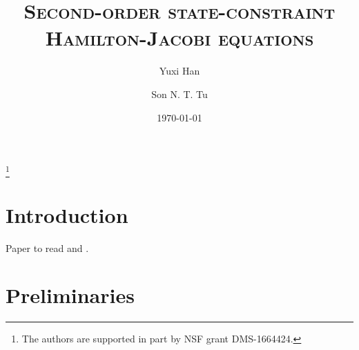 \documentclass[11pt,reqno]{amsart}
\numberwithin{figure}{section}
\theoremstyle{plain}
\theoremstyle{remark}
\numberwithin{equation}{section}
\begin{document}
\title[Rate of convergence]
{\textsc{Second-order state-constraint Hamilton-Jacobi equations}}




\thanks{The authors are supported in part by NSF grant DMS-1664424.}

\begin{abstract}

\end{abstract}




\author{Yuxi Han}
\address[Y. Han]
{
Department of Mathematics, 
University of Wisconsin Madison, 480 Lincoln  Drive, Madison, WI 53706, USA}



\author{Son N. T. Tu}
\address[S. N.T. Tu]
{
Department of Mathematics, 
University of Wisconsin Madison, 480 Lincoln  Drive, Madison, WI 53706, USA}

\date{\today}


\maketitle










\section{Introduction}\label{sec:intro}
Paper to read \cite{Ishii2017a} and \cite{Lasry1989}.



\section{Preliminaries}\label{sec:prelim}
\end{document}
